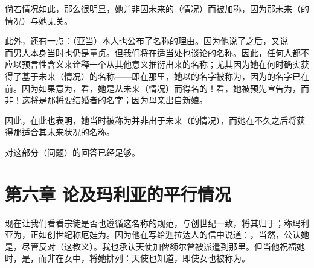 倘若情况如此，那么很明显，她并非因未来的（情况）而被加称，因为那未来（的情况）与她无关。\par

此外，还有一点：（亚当）本人也公布了名称的理由。因为他说了之后，又说——而男人本身当时也仍是童贞。但我们将在适当处也谈论的名称。因此，任何人都不应以预言性含义来诠释一个从其他意义推衍出来的名称；尤其因为她在何时确实获得了基于未来（情况）的名称——即在那里，她以的名字被称为，因为的名字已在前。因为如果意为，看，她是从未来（情况）而得名的！看，她被预先宣告为，而非！这将是那将要结婚者的名字；因为母亲出自新娘。\par

因此，在此也表明，她当时被称为并非出于未来（的情况），而她在不久之后将获得那适合其未来状况的名称。\par

对这部分（问题）的回答已经足够。\par


\section{第六章 论及玛利亚的平行情况}

现在让我们看看宗徒是否也遵循这名称的规范，与创世纪一致，将其归于；称玛利亚为，正如创世纪称厄娃为。因为他在写给迦拉达人的信中说道：，当然，公认她是，尽管反对（这教义）。我也承认天使加俾额尔曾被派遣到那里。但当他祝福她时，是，而非在女中，将她排列：天使也知道，即使女也被称为。\par

